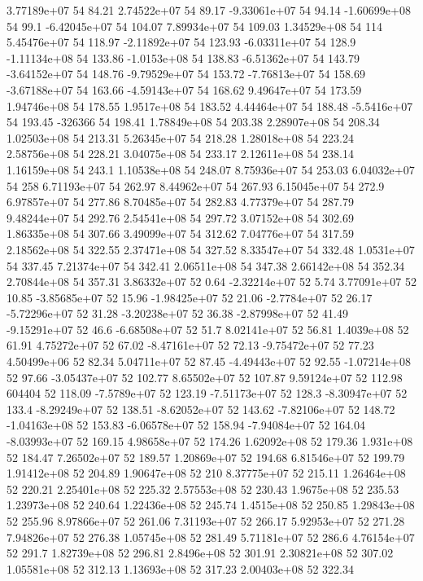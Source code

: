 3.77189e+07 54 84.21
2.74522e+07 54 89.17
-9.33061e+07 54 94.14
-1.60699e+08 54 99.1
-6.42045e+07 54 104.07
7.89934e+07 54 109.03
1.34529e+08 54 114
5.45476e+07 54 118.97
-2.11892e+07 54 123.93
-6.03311e+07 54 128.9
-1.11134e+08 54 133.86
-1.0153e+08 54 138.83
-6.51362e+07 54 143.79
-3.64152e+07 54 148.76
-9.79529e+07 54 153.72
-7.76813e+07 54 158.69
-3.67188e+07 54 163.66
-4.59143e+07 54 168.62
9.49647e+07 54 173.59
1.94746e+08 54 178.55
1.9517e+08 54 183.52
4.44464e+07 54 188.48
-5.5416e+07 54 193.45
-326366 54 198.41
1.78849e+08 54 203.38
2.28907e+08 54 208.34
1.02503e+08 54 213.31
5.26345e+07 54 218.28
1.28018e+08 54 223.24
2.58756e+08 54 228.21
3.04075e+08 54 233.17
2.12611e+08 54 238.14
1.16159e+08 54 243.1
1.10538e+08 54 248.07
8.75936e+07 54 253.03
6.04032e+07 54 258
6.71193e+07 54 262.97
8.44962e+07 54 267.93
6.15045e+07 54 272.9
6.97857e+07 54 277.86
8.70485e+07 54 282.83
4.77379e+07 54 287.79
9.48244e+07 54 292.76
2.54541e+08 54 297.72
3.07152e+08 54 302.69
1.86335e+08 54 307.66
3.49099e+07 54 312.62
7.04776e+07 54 317.59
2.18562e+08 54 322.55
2.37471e+08 54 327.52
8.33547e+07 54 332.48
1.0531e+07 54 337.45
7.21374e+07 54 342.41
2.06511e+08 54 347.38
2.66142e+08 54 352.34
2.70844e+08 54 357.31
3.86332e+07 52 0.64
-2.32214e+07 52 5.74
3.77091e+07 52 10.85
-3.85685e+07 52 15.96
-1.98425e+07 52 21.06
-2.7784e+07 52 26.17
-5.72296e+07 52 31.28
-3.20238e+07 52 36.38
-2.87998e+07 52 41.49
-9.15291e+07 52 46.6
-6.68508e+07 52 51.7
8.02141e+07 52 56.81
1.4039e+08 52 61.91
4.75272e+07 52 67.02
-8.47161e+07 52 72.13
-9.75472e+07 52 77.23
4.50499e+06 52 82.34
5.04711e+07 52 87.45
-4.49443e+07 52 92.55
-1.07214e+08 52 97.66
-3.05437e+07 52 102.77
8.65502e+07 52 107.87
9.59124e+07 52 112.98
604404 52 118.09
-7.5789e+07 52 123.19
-7.51173e+07 52 128.3
-8.30947e+07 52 133.4
-8.29249e+07 52 138.51
-8.62052e+07 52 143.62
-7.82106e+07 52 148.72
-1.04163e+08 52 153.83
-6.06578e+07 52 158.94
-7.94084e+07 52 164.04
-8.03993e+07 52 169.15
4.98658e+07 52 174.26
1.62092e+08 52 179.36
1.931e+08 52 184.47
7.26502e+07 52 189.57
1.20869e+07 52 194.68
6.81546e+07 52 199.79
1.91412e+08 52 204.89
1.90647e+08 52 210
8.37775e+07 52 215.11
1.26464e+08 52 220.21
2.25401e+08 52 225.32
2.57553e+08 52 230.43
1.9675e+08 52 235.53
1.23973e+08 52 240.64
1.22436e+08 52 245.74
1.4515e+08 52 250.85
1.29843e+08 52 255.96
8.97866e+07 52 261.06
7.31193e+07 52 266.17
5.92953e+07 52 271.28
7.94826e+07 52 276.38
1.05745e+08 52 281.49
5.71181e+07 52 286.6
4.76154e+07 52 291.7
1.82739e+08 52 296.81
2.8496e+08 52 301.91
2.30821e+08 52 307.02
1.05581e+08 52 312.13
1.13693e+08 52 317.23
2.00403e+08 52 322.34

